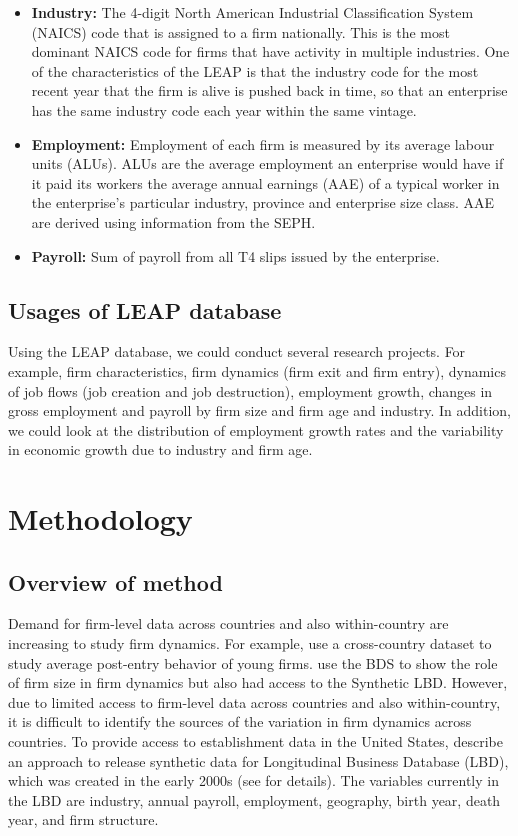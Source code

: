 \documentclass{article}
\begin{document}
\begin{itemize}
\item \textbf{Industry:} The 4-digit North American Industrial Classification System (NAICS) code that is assigned to a firm nationally.  This is the most dominant NAICS code for firms that have activity in multiple industries. One of the characteristics of the LEAP is that the industry code for the most recent year that the firm is alive is pushed back in time, so that an enterprise has the same industry code each year within the same vintage.  
\item \textbf{Employment:} Employment of each firm is measured by its average labour units (ALUs). ALUs are the average employment an enterprise would have if it paid its workers the average annual earnings (AAE) of a typical worker in the enterprise's particular industry, province and enterprise size class. AAE are derived using information from the SEPH.
\item \textbf{Payroll:} Sum of payroll from all T4 slips issued by the enterprise.
\end{itemize}


\subsection{Usages of LEAP database}
Using the LEAP database, we could conduct several research projects. For example, firm characteristics, firm dynamics (firm exit and firm entry), dynamics of job flows (job creation and job destruction), employment growth, changes in gross employment and payroll by firm size and firm age and industry. In addition, we could look at the distribution of employment growth rates and the variability in economic growth due to industry and firm age. 


\section{Methodology}
\subsection{Overview of method}
Demand for firm-level data across countries and also within-country are increasing to study firm dynamics. For example,  \textcite{NBERc0480} use a cross-country dataset to study average post-entry behavior of young firms. \textcite{10.1257/aer.20141280} use the BDS to show the role of firm size in firm dynamics but also had access to the Synthetic LBD. However, due to limited access to firm-level data across countries and also within-country, it is difficult to identify the sources of the variation in firm dynamics across countries. To provide access to establishment data in the United States, \textcite{RePEc:bla:istatr:v:79:y:2011:i:3:p:362-384} describe an approach to release synthetic data for Longitudinal Business Database (LBD), which was created in the early 2000s (see \textcite{RePEc:cen:wpaper:02-17} for details). The variables currently in the LBD are industry, annual payroll, employment, geography, birth year, death year, and firm structure.    
\end{document}
